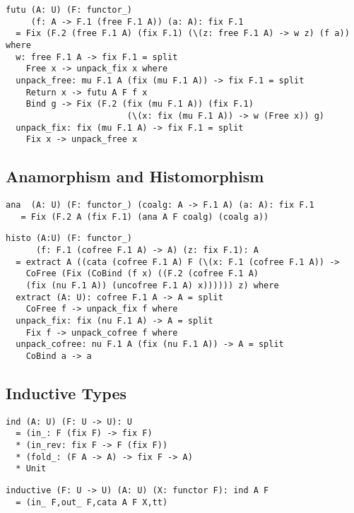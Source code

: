 \documentclass{article}
\begin{document}
\begin{lstlisting}[mathescape=true]
futu (A: U) (F: functor_)
     (f: A -> F.1 (free F.1 A)) (a: A): fix F.1
  = Fix (F.2 (free F.1 A) (fix F.1) (\(z: free F.1 A) -> w z) (f a)) where
  w: free F.1 A -> fix F.1 = split
    Free x -> unpack_fix x where
  unpack_free: mu F.1 A (fix (mu F.1 A)) -> fix F.1 = split
    Return x -> futu A F f x
    Bind g -> Fix (F.2 (fix (mu F.1 A)) (fix F.1)
                        (\(x: fix (mu F.1 A)) -> w (Free x)) g)
  unpack_fix: fix (mu F.1 A) -> fix F.1 = split
    Fix x -> unpack_free x
\end{lstlisting}

\subsection{Anamorphism and Histomorphism}

\begin{lstlisting}[mathescape=true]
ana  (A: U) (F: functor_) (coalg: A -> F.1 A) (a: A): fix F.1
   = Fix (F.2 A (fix F.1) (ana A F coalg) (coalg a))
\end{lstlisting}

\begin{lstlisting}[mathescape=true]
histo (A:U) (F: functor_)
      (f: F.1 (cofree F.1 A) -> A) (z: fix F.1): A
  = extract A ((cata (cofree F.1 A) F (\(x: F.1 (cofree F.1 A)) ->
    CoFree (Fix (CoBind (f x) ((F.2 (cofree F.1 A)
    (fix (nu F.1 A)) (uncofree F.1 A) x)))))) z) where
  extract (A: U): cofree F.1 A -> A = split
    CoFree f -> unpack_fix f where
  unpack_fix: fix (nu F.1 A) -> A = split
    Fix f -> unpack_cofree f where
  unpack_cofree: nu F.1 A (fix (nu F.1 A)) -> A = split
    CoBind a -> a
\end{lstlisting}

\subsection{Inductive Types}

\begin{lstlisting}[mathescape=true]
ind (A: U) (F: U -> U): U
  = (in_: F (fix F) -> fix F)
  * (in_rev: fix F -> F (fix F))
  * (fold_: (F A -> A) -> fix F -> A)
  * Unit
\end{lstlisting}

\begin{lstlisting}[mathescape=true]
inductive (F: U -> U) (A: U) (X: functor F): ind A F
  = (in_ F,out_ F,cata A F X,tt)
\end{lstlisting}
\end{document}
